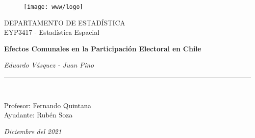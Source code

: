 \begin{titlepage}
\begin{center}

\vspace*{-0.7in}
\begin{figure}[htb]
\begin{center}
\texttt{[image: www/logo]}
\end{center}
\end{figure}
\Large DEPARTAMENTO DE ESTADÍSTICA\\

\Large EYP3417 - Estadística Espacial\\
\vspace*{1.5in}



\begin{large}


\Huge \textbf{Efectos Comunales en la Participación Electoral en Chile} \\
\end{large}
\vspace*{2.5in}


\vspace*{0.5in}
\begin{large}
\textit{Eduardo Vásquez - Juan Pino}\\
\end{large}
\vspace*{0.5in}
\rule{80mm}{0.1mm}\\
\vspace*{0.1in}
\begin{large}
Profesor: Fernando Quintana \\
Ayudante: Rubén Soza \\
\vspace*{0.5in}



\textit{Diciembre del 2021}
\end{large}
\end{center}
\end{titlepage}